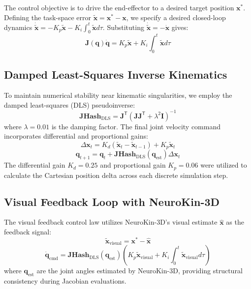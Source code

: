 \documentclass[12pt,a4paper,oneside]{report}
\begin{document}
The control objective is to drive the end-effector to a desired target position $\mathbf{x}^*$. Defining the task-space error $\tilde{\mathbf{x}} = \mathbf{x}^* - \mathbf{x}$, we specify a desired closed-loop dynamics $\dot{\tilde{\mathbf{x}}} = -K_p \tilde{\mathbf{x}} - K_i \int_0^t \tilde{\mathbf{x}} d\tau$. Substituting $\dot{\tilde{\mathbf{x}}} = -\dot{\mathbf{x}}$ gives:
\begin{equation}
\mathbf{J}(\mathbf{q}) \dot{\mathbf{q}} = K_p \tilde{\mathbf{x}} + K_i \int_0^t \tilde{\mathbf{x}} d\tau
\end{equation}

\subsection{Damped Least-Squares Inverse Kinematics}
To maintain numerical stability near kinematic singularities, we employ the damped least-squares (DLS) pseudoinverse:
\begin{equation}
\mathbf{JHash}_{\text{DLS}} = \mathbf{J}^{\mathsf{T}} (\mathbf{J} \mathbf{J}^{\mathsf{T}} + \lambda^2 \mathbf{I})^{-1}
\end{equation}
where $\lambda = 0.01$ is the damping factor. The final joint velocity command incorporates differential and proportional gains:
\begin{equation}
\Delta \mathbf{x}_t = K_d (\tilde{\mathbf{x}}_t - \tilde{\mathbf{x}}_{t-1}) + K_p \tilde{\mathbf{x}}_t
\end{equation}
\begin{equation}
\mathbf{q}_{t+1} = \mathbf{q}_t + \mathbf{JHash}_{\text{DLS}}(\mathbf{q}_{\text{est}}) \Delta \mathbf{x}_t
\end{equation}
The differential gain $K_d = 0.25$ and proportional gain $K_p = 0.06$ were utilized to calculate the Cartesian position delta across each discrete simulation step.

\subsection{Visual Feedback Loop with NeuroKin-3D}
The visual feedback control law utilizes NeuroKin-3D's visual estimate $\hat{\mathbf{x}}$ as the feedback signal:
\begin{equation}
\tilde{\mathbf{x}}_{\text{visual}} = \mathbf{x}^* - \hat{\mathbf{x}}
\end{equation}
\begin{equation}
\dot{\mathbf{q}}_{\text{cmd}} = \mathbf{JHash}_{\text{DLS}}(\mathbf{q}_{\text{est}}) \left( K_p \tilde{\mathbf{x}}_{\text{visual}} + K_i \int_0^t \tilde{\mathbf{x}}_{\text{visual}} d\tau \right)
\end{equation}
where $\mathbf{q}_{\text{est}}$ are the joint angles estimated by NeuroKin-3D, providing structural consistency during Jacobian evaluations.
\end{document}
